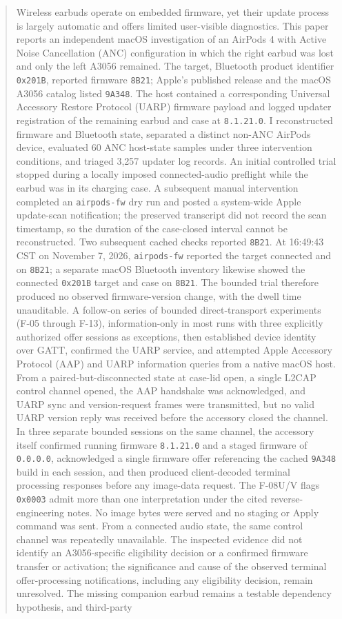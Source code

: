 \documentclass[11pt,letterpaper]{article}
\begin{document}
\begin{abstract}
Wireless earbuds operate on embedded firmware, yet their update process is largely automatic and offers limited user-visible diagnostics. This paper reports an independent macOS investigation of an AirPods 4 with Active Noise Cancellation (ANC) configuration in which the right earbud was lost and only the left A3056 remained. The target, Bluetooth product identifier \texttt{0x201B}, reported firmware \texttt{8B21}; Apple's published release and the macOS A3056 catalog listed \texttt{9A348}. The host contained a corresponding Universal Accessory Restore Protocol (UARP) firmware payload and logged updater registration of the remaining earbud and case at \texttt{8.1.21.0}. I reconstructed firmware and Bluetooth state, separated a distinct non-ANC AirPods device, evaluated 60 ANC host-state samples under three intervention conditions, and triaged 3,257 updater log records. An initial controlled trial stopped during a locally imposed connected-audio preflight while the earbud was in its charging case. A subsequent manual intervention completed an \texttt{airpods-fw} dry run and posted a system-wide Apple update-scan notification; the preserved transcript did not record the scan timestamp, so the duration of the case-closed interval cannot be reconstructed. Two subsequent cached checks reported \texttt{8B21}. At 16:49:43 CST on November 7, 2026, \texttt{airpods-fw} reported the target connected and on \texttt{8B21}; a separate macOS Bluetooth inventory likewise showed the connected \texttt{0x201B} target and case on \texttt{8B21}. The bounded trial therefore produced no observed firmware-version change, with the dwell time unauditable. A follow-on series of bounded direct-transport experiments (F-05 through F-13), information-only in most runs with three explicitly authorized offer sessions as exceptions, then established device identity over GATT, confirmed the UARP service, and attempted Apple Accessory Protocol (AAP) and UARP information queries from a native macOS host. From a paired-but-disconnected state at case-lid open, a single L2CAP control channel opened, the AAP handshake was acknowledged, and UARP sync and version-request frames were transmitted, but no valid UARP version reply was received before the accessory closed the channel. In three separate bounded sessions on the same channel, the accessory itself confirmed running firmware \texttt{8.1.21.0} and a staged firmware of \texttt{0.0.0.0}, acknowledged a single firmware offer referencing the cached \texttt{9A348} build in each session, and then produced client-decoded terminal processing responses before any image-data request. The F-08U/V flags \texttt{0x0003} admit more than one interpretation under the cited reverse-engineering notes. No image bytes were served and no staging or Apply command was sent. From a connected audio state, the same control channel was repeatedly unavailable. The inspected evidence did not identify an A3056-specific eligibility decision or a confirmed firmware transfer or activation; the significance and cause of the observed terminal offer-processing notifications, including any eligibility decision, remain unresolved. The missing companion earbud remains a testable dependency hypothesis, and third-party 
\end{abstract}
\end{document}
